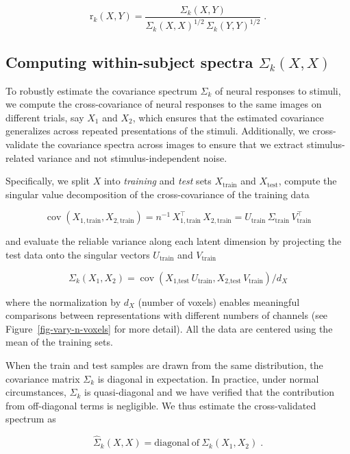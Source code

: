 \documentclass[10pt]{article}
\begin{document}
\[
\mathrm{r}_k(X, Y) =  \frac{\Sigma_k(X, Y)}{\Sigma_k(X, X)^{1/2}\, \Sigma_k(Y, Y)^{1/2}}\;.
\]

\subsection{\texorpdfstring{Computing within-subject spectra
\(\Sigma_k(X, X)\)}{Computing within-subject spectra \textbackslash Sigma\_k(X, X)}}\label{computing-within-subject-spectra-sigma_kx-x}

To robustly estimate the covariance spectrum \(\Sigma_k\) of neural
responses to stimuli, we compute the cross-covariance of neural
responses to the same images on different trials, say \(X_1\) and
\(X_2\), which ensures that the estimated covariance generalizes across
repeated presentations of the stimuli. Additionally, we cross-validate
the covariance spectra across images to ensure that we extract
stimulus-related variance and not stimulus-independent noise.

Specifically, we split \(X\) into \emph{training} and \emph{test} sets
\(X_\text{train}\) and \(X_\text{test}\), compute the singular value
decomposition of the cross-covariance of the training data

\[
\operatorname{cov}
\left(X_{1,\text{train}} , X_{2,\text{train}}\right)
= n^{-1}\,X_{1,\text{train}}^\top\,X_{2,\text{train}}
= U_\text{train}\, \Sigma_\text{train}\, V_\text{train}^\top
\]

and evaluate the reliable variance along each latent dimension by
projecting the test data onto the singular vectors \(U_\text{train}\)
and \(V_\text{train}\)

\[
\Sigma_{k}(X_1, X_2) = \operatorname{cov}
\left(X_{\text{1,test}}\,U_\text{train}, X_{\text{2,test}}\,V_\text{train} \right) / d_X
\]

where the normalization by \(d_X\) (number of voxels) enables meaningful
comparisons between representations with different numbers of channels
(see Figure~\ref{fig-vary-n-voxels} for more detail). All the data are
centered using the mean of the training sets.

When the train and test samples are drawn from the same distribution,
the covariance matrix \(\Sigma_{k}\) is diagonal in expectation. In
practice, under normal circumstances, \(\Sigma_{k}\) is quasi-diagonal
and we have verified that the contribution from off-diagonal terms is
negligible. We thus estimate the cross-validated spectrum as

\[
\hat{\Sigma}_k(X, X) = \mathrm{diagonal~of~}\Sigma_{k}(X_1, X_2)\;.
\]
\end{document}

